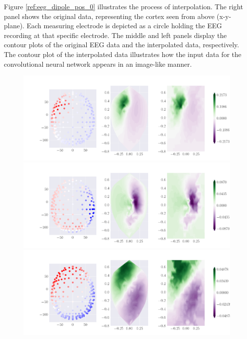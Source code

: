 \documentclass[a4paper, UKenglish, 11pt]{uiomaster}
\begin{document}
Figure \ref{ref:eeg_dipole_pos_0} illustrates the process of interpolation. The right panel shows the original data, representing the cortex seen from above (x-y-plane). Each measuring electrode is depicted as a circle holding the EEG recording at that specific electrode. The middle and left panels display the contour plots of the original EEG data and the interpolated data, respectively. The contour plot of the interpolated data illustrates how the input data for the convolutional neural network appears in an image-like manner.


\begin{figure}[!htb]
\centering
\includegraphics[width=\linewidth]{../Code/plots/finals/new_eeg_dipole_pos_0.png}
\includegraphics[width=\linewidth]{../Code/plots/finals/new_eeg_dipole_pos_4.png}
\includegraphics[width=\linewidth]{../Code/plots/finals/new_eeg_dipole_pos_6.png}


\end{figure}
\end{document}
